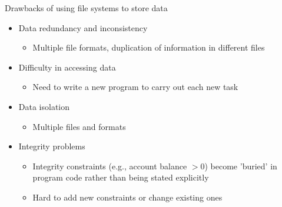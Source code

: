 \documentclass[aspectratio=169, xcolor=dvipsnames]{beamer}
\begin{document}
\begin{frame}{Drawbacks of using file systems to store data}
    \begin{itemize}[<+->]
        \item Data redundancy and inconsistency
        \begin{itemize}
            \item Multiple file formats, duplication of information in different files
        \end{itemize}
        \item Difficulty in accessing data
        \begin{itemize}
            \item Need to write a new program to carry out each new task
        \end{itemize}
        \item Data isolation
        \begin{itemize}
            \item Multiple files and formats
        \end{itemize}
        \item Integrity problems
        \begin{itemize}
            \item Integrity constraints (e.g., account balance $> 0$) become 'buried' in program code rather than being stated explicitly
            \item Hard to add new constraints or change existing ones
        \end{itemize}
    \end{itemize}
\end{frame}
\end{document}
